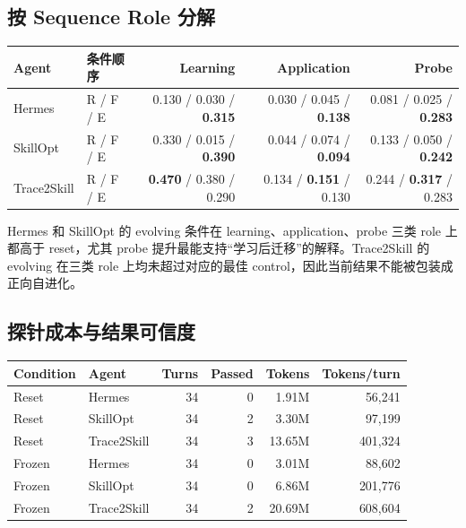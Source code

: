 \documentclass[11pt,a4paper]{article}
\begin{document}
\subsection{按 Sequence Role 分解}

\begin{center}
\scriptsize
\renewcommand{\arraystretch}{1.2}
\begin{tabular}{llrrr}
\toprule
Agent & 条件顺序 & Learning & Application & Probe \\
\midrule
Hermes & R / F / E & 0.130 / 0.030 / \textbf{0.315} & 0.030 / 0.045 / \textbf{0.138} & 0.081 / 0.025 / \textbf{0.283} \\
SkillOpt & R / F / E & 0.330 / 0.015 / \textbf{0.390} & 0.044 / 0.074 / \textbf{0.094} & 0.133 / 0.050 / \textbf{0.242} \\
Trace2Skill & R / F / E & \textbf{0.470} / 0.380 / 0.290 & 0.134 / \textbf{0.151} / 0.130 & 0.244 / \textbf{0.317} / 0.283 \\
\bottomrule
\end{tabular}
\end{center}

Hermes 和 SkillOpt 的 evolving 条件在 learning、application、probe 三类 role 上都高于 reset，尤其 probe 提升最能支持“学习后迁移”的解释。Trace2Skill 的 evolving 在三类 role 上均未超过对应的最佳 control，因此当前结果不能被包装成正向自进化。

\subsection{探针成本与结果可信度}

\begin{center}
\renewcommand{\arraystretch}{1.2}
\begin{tabular}{llrrrr}
\toprule
Condition & Agent & Turns & Passed & Tokens & Tokens/turn \\
\midrule
Reset & Hermes & 34 & 0 & 1.91M & 56,241 \\
Reset & SkillOpt & 34 & 2 & 3.30M & 97,199 \\
Reset & Trace2Skill & 34 & 3 & 13.65M & 401,324 \\
Frozen & Hermes & 34 & 0 & 3.01M & 88,602 \\
Frozen & SkillOpt & 34 & 0 & 6.86M & 201,776 \\
Frozen & Trace2Skill & 34 & 2 & 20.69M & 608,604 \\
\bottomrule
\end{tabular}
\end{center}
\end{document}
